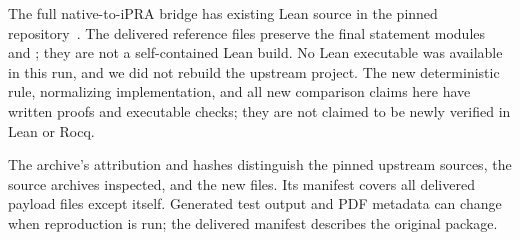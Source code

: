The full native-to-iPRA bridge has existing Lean source in the pinned
repository~\cite{lean}. The delivered reference files preserve the final
statement modules  and
; they are not a self-contained Lean build.
No Lean executable was available in this run, and we did not rebuild the
upstream project. The new deterministic rule, normalizing implementation,
and all new comparison claims here have written proofs and executable checks;
they are not claimed to be newly verified in Lean or Rocq.

The archive's attribution and hashes distinguish the pinned upstream sources,
the source archives inspected, and the new files. Its manifest covers all
delivered payload files except itself. Generated test output and PDF metadata
can change when reproduction is run; the delivered manifest describes the
original package.
